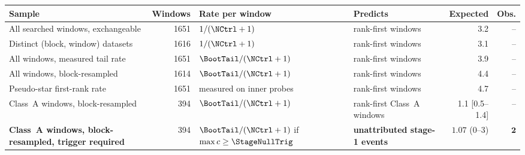 \begin{tabular}{@{}p{}rp{}p{}rr@{}}
\toprule
Sample & Windows & Rate per window & Predicts & Expected & Obs. \\
\midrule
All searched windows, exchangeable & 1651 & $1/(\NCtrl+1)$ & rank-first windows & 3.2 & -- \\
Distinct (block, window) datasets & 1616 & $1/(\NCtrl+1)$ & rank-first windows & 3.1 & -- \\
All windows, measured tail rate & 1651 & $\BootTail/(\NCtrl+1)$ & rank-first windows & 3.9 & -- \\
All windows, block-resampled & 1614 & $\BootTail/(\NCtrl+1)$ & rank-first windows & 4.4 & -- \\
Pseudo-star first-rank rate & 1651 & measured on inner probes & rank-first windows & 4.7 & -- \\
Class~A windows, block-resampled & 394 & $\BootTail/(\NCtrl+1)$ & rank-first Class~A windows & 1.1 [0.5--1.4] & -- \\
\textbf{Class~A windows, block-resampled, trigger required} & 394 & $\BootTail/(\NCtrl+1)$ if $\max c\geq\StageNullTrig$ & \textbf{unattributed stage-1 events} & $\mathbf{1.07}$ (0--3) & $\mathbf{2}$ \\
\bottomrule
\end{tabular}
